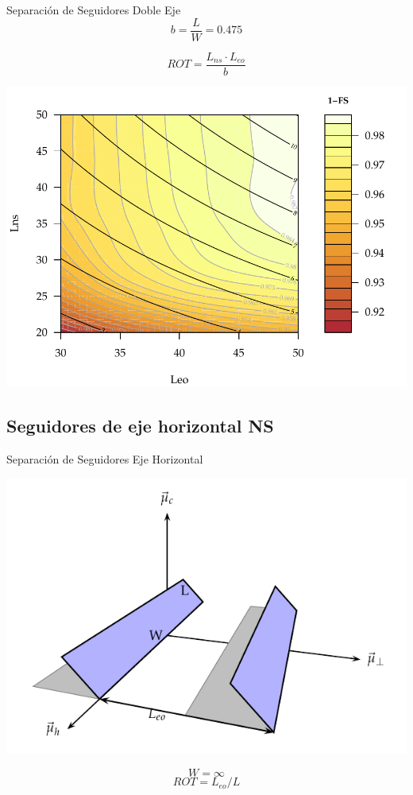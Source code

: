 \documentclass[xcolor={usenames,svgnames,dvipsnames}]{beamer}
\begin{document}
\begin{frame}[label={sec:orgcc3194e}]{Separación de Seguidores Doble Eje}
$$b=\frac{L}{W}=0.475$$

$$ROT=\frac{L_{ns}\cdot L_{eo}}{b}$$

\begin{center}
\includegraphics[width=.9\linewidth]{../figs/AbacoSeguidor2X_Ene10.pdf}
\end{center}
\end{frame}


\subsection{Seguidores de eje horizontal NS}
\label{sec:orgf48cfd8}

\begin{frame}[label={sec:org0c2f830}]{Separación de Seguidores Eje Horizontal}
\begin{center}
\includegraphics[width=.9\linewidth]{../figs/SombrasHoriz.pdf}
\end{center}

$$W=\infty$$ $$ROT=L_{eo}/L$$
\end{frame}
\end{document}
